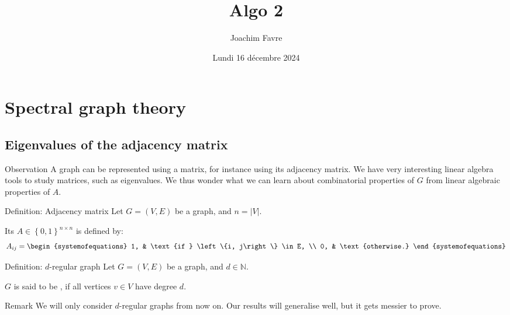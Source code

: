 \documentclass[a4paper]{article}
\title{Algo 2}
\author{Joachim Favre}
\date{Lundi 16 décembre 2024}
\begin{document}
\maketitle


\section{Spectral graph theory}

\subsection{Eigenvalues of the adjacency matrix}

\begin{parag}{Observation}
    A graph can be represented using a matrix, for instance using its adjacency matrix. We have very interesting linear algebra tools to study matrices, such as eigenvalues. We thus wonder what we can learn about combinatorial properties of $G$ from linear algebraic properties of $A$.
\end{parag}

\begin{parag}{Definition: Adjacency matrix}
    Let $G = \left(V, E\right)$ be a graph, and $n = \left|V\right|$. 

    Its  $A \in \left\{0, 1\right\}^{n \times n}$ is defined by: 
    \[A_{ij} = \begin{systemofequations} 1, & \text{if } \left\{i, j\right\} \in E, \\ 0, & \text{otherwise.} \end{systemofequations}\]
\end{parag}

\begin{parag}{Definition: $d$-regular graph}
    Let $G = \left(V, E\right)$ be a graph, and $d \in \mathbb{N}$.

    $G$ is said to be , if all vertices $v \in V$ have degree $d$.

    \begin{subparag}{Remark}
        We will only consider $d$-regular graphs from now on. Our results will generalise well, but it gets messier to prove.
    \end{subparag}
\end{parag}
\end{document}
